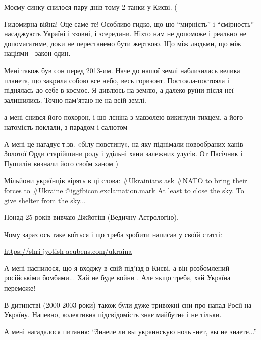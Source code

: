 \begin{itemize}
Моєму синку снилося пару днів тому 2 танки у Києві. (


Гидомирна війна! Оце саме те! Особливо гидко, що цю \enquote{мирність} і \enquote{смірность}
насаджують Україні і ззовні, і зсередини. Ніхто нам не допоможе і реально не
допомагатиме, доки не перестанемо бути жертвою. Що між людьми, що між націями -
закон один.


Мені також був сон перед 2013-им. Наче до нашої землі наблизилась велика
планета, що закрила собою все небо, весь горизонт. Постояла-постояла і
піднялась до себе в космос. Я дивлюсь на землю, а далеко руїни після неї
залишились. Точно пам'ятаю-не на всій землі.


а мені снився його похорон, і шо лєніна з мавзолею викинули тихцем, а його
натомість поклали, з парадом і салютом


А мені це нагадує т.зв. «білу повстину», на яку піднімали новообраних ханів
Золотої Орди старійшини роду і удільні хани залежних улусів. От Пасічник і
Пушилін визнали його своїм ханом )


Мільйони українців вірять в ці слова: \#Ukrainians ask \#NATO to bring their
forces to \#Ukraine @igg{fbicon.exclamation.mark} At least to close the sky. To
give shelter from the sky...


Понад 25 років вивчаю Джйотіш (Ведичну Астрологію).

Чому зараз ось таке коїться і що треба зробити написав у своїй статті:

\url{https://shri-jyotish-acubens.com/ukraina}


А мені наснилося, що я входжу в свій під'їзд в Києві, а він розбомлений
російськіми бомбами... Хай не буде войни . Але якщо треба, хай Україна
переможе!


В дитинстві (2000-2003 роки) також були дуже тривожні сни про напад Росії на
Україну. Напевно, колективна підсвідомість знає майбутнє і не тільки.

А мені нагадалося питання:
\enquote{Знаеие ли вы украинскую ночь
-нет, вы не знаете...}


\end{itemize}
